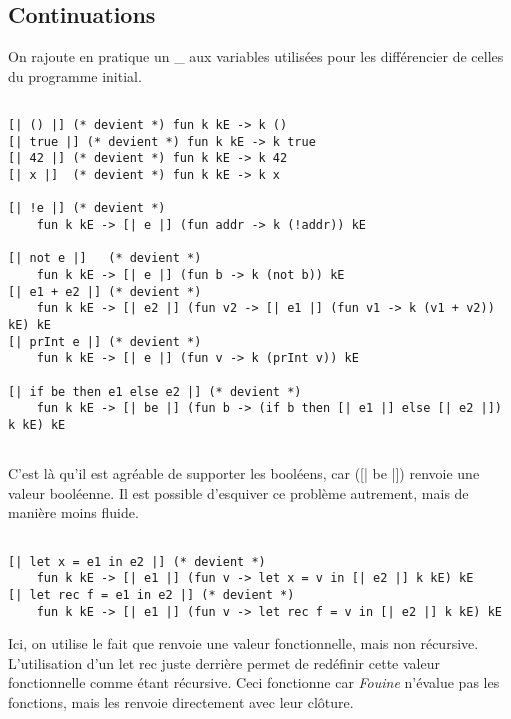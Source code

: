\documentclass{article}
\newcommand\code[1]{{\fontfamily{lmtt}\selectfont #1}}
\begin{document}
\subsection{Continuations}

	On rajoute en pratique un \code{\_} aux variables utilisées pour les différencier de celles du programme initial.

	\begin{verbatim}

[| () |] (* devient *) fun k kE -> k ()
[| true |] (* devient *) fun k kE -> k true
[| 42 |] (* devient *) fun k kE -> k 42
[| x |]  (* devient *) fun k kE -> k x

[| !e |] (* devient *) 
	fun k kE -> [| e |] (fun addr -> k (!addr)) kE

[| not e |]   (* devient *) 
	fun k kE -> [| e |] (fun b -> k (not b)) kE
[| e1 + e2 |] (* devient *) 
	fun k kE -> [| e2 |] (fun v2 -> [| e1 |] (fun v1 -> k (v1 + v2)) kE) kE
[| prInt e |] (* devient *) 
	fun k kE -> [| e |] (fun v -> k (prInt v)) kE

[| if be then e1 else e2 |] (* devient *) 
	fun k kE -> [| be |] (fun b -> (if b then [| e1 |] else [| e2 |]) k kE) kE
	
	\end{verbatim}
	
	C'est là qu'il est agréable de supporter les booléens, car \code([| be |]) renvoie une valeur booléenne. Il est possible d'esquiver ce problème autrement, mais de manière moins fluide.
	
	\begin{verbatim}
	
[| let x = e1 in e2 |] (* devient *) 
	fun k kE -> [| e1 |] (fun v -> let x = v in [| e2 |] k kE) kE 
[| let rec f = e1 in e2 |] (* devient *) 
	fun k kE -> [| e1 |] (fun v -> let rec f = v in [| e2 |] k kE) kE

	\end{verbatim}
	
	Ici, on utilise le fait que \code{[| e1 |]} renvoie une valeur fonctionnelle, mais non récursive. L'utilisation d'un \code{let rec} juste derrière permet de redéfinir cette valeur fonctionnelle comme étant récursive. Ceci fonctionne car \emph{Fouine} n'évalue pas les fonctions, mais les renvoie directement avec leur clôture.
	
\end{document}
